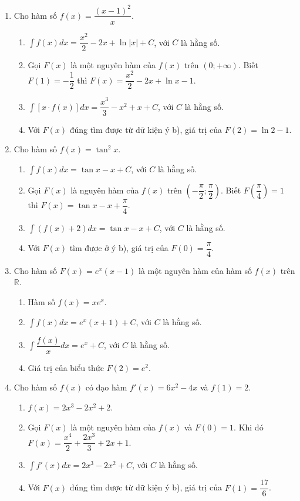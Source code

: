 \documentclass[12pt]{article}
\begin{document}
\begin{enumerate}[label=\textbf{Câu \arabic*.}, start=1]
		\item Cho hàm số $f(x) = \dfrac{(x-1)^2}{x}$.
		\begin{enumerate}[label=\alph*)]
			\item $\displaystyle \int f(x) dx = \dfrac{x^2}{2} - 2x + \ln|x| + C$, với $C$ là hằng số.
			\item Gọi $F(x)$ là một nguyên hàm của $f(x)$ trên $(0; +\infty)$. Biết $F(1) = -\dfrac{1}{2}$ thì $F(x) = \dfrac{x^2}{2} - 2x + \ln x - 1$.
			\item $\displaystyle \int [x \cdot f(x)] dx = \dfrac{x^3}{3} - x^2 + x + C$, với $C$ là hằng số.
			\item Với $F(x)$ đúng tìm được từ dữ kiện ý b), giá trị của $F(2) = \ln 2 - 1$.
		\end{enumerate}
		
		\item Cho hàm số $f(x) = \tan^2 x$.
		\begin{enumerate}[label=\alph*)]
			\item $\displaystyle \int f(x) dx = \tan x - x + C$, với $C$ là hằng số.
			\item Gọi $F(x)$ là nguyên hàm của $f(x)$ trên $\left(-\dfrac{\pi}{2}; \dfrac{\pi}{2}\right)$. Biết $F\left(\dfrac{\pi}{4}\right) = 1$ thì $F(x) = \tan x - x + \dfrac{\pi}{4}$.
			\item $\displaystyle \int (f(x) + 2) dx = \tan x - x + C$, với $C$ là hằng số.
			\item Với $F(x)$ tìm được ở ý b), giá trị của $F(0) = \dfrac{\pi}{4}$.
		\end{enumerate}
		
		\item Cho hàm số $F(x) = e^x(x - 1)$ là một nguyên hàm của hàm số $f(x)$ trên $\mathbb{R}$.
		\begin{enumerate}[label=\alph*)]
			\item Hàm số $f(x) = x e^x$.
			\item $\displaystyle \int f(x) dx = e^x(x + 1) + C$, với $C$ là hằng số.
			\item $\displaystyle \int \dfrac{f(x)}{x} dx = e^x + C$, với $C$ là hằng số.
			\item Giá trị của biểu thức $F(2) = e^2$.
		\end{enumerate}
		
		\item Cho hàm số $f(x)$ có đạo hàm $f'(x) = 6x^2 - 4x$ và $f(1) = 2$.
		\begin{enumerate}[label=\alph*)]
			\item $f(x) = 2x^3 - 2x^2 + 2$.
			\item Gọi $F(x)$ là một nguyên hàm của $f(x)$ và $F(0) = 1$. Khi đó $F(x) = \dfrac{x^4}{2} + \dfrac{2x^3}{3} + 2x + 1$.
			\item $\displaystyle \int f'(x) dx = 2x^3 - 2x^2 + C$, với $C$ là hằng số.
			\item Với $F(x)$ đúng tìm được từ dữ kiện ý b), giá trị của $F(1) = \dfrac{17}{6}$.
		\end{enumerate}
		

\end{enumerate}
\end{document}
